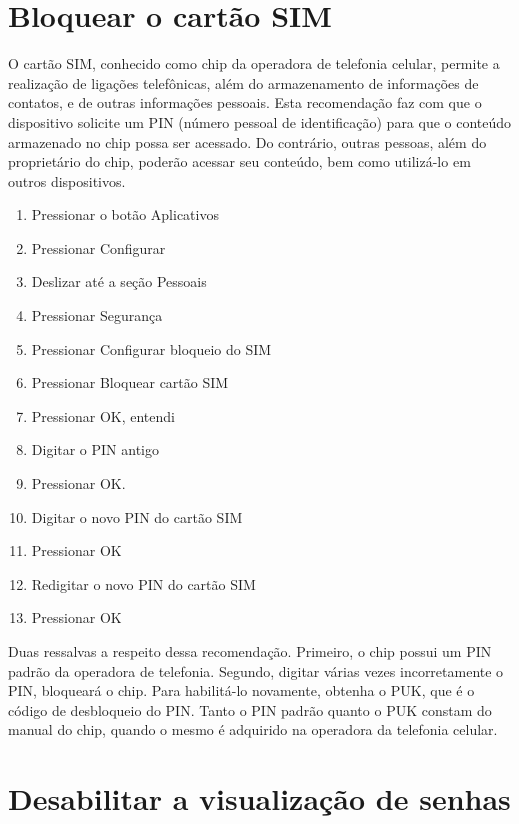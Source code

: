 \section{Bloquear o cart\~ao SIM}

O cart\~ao SIM, conhecido como chip da operadora de telefonia celular, permite a realiza\c c\~ao de liga\c c\~oes telef\^onicas, al\'em do armazenamento de informa\c c\~oes de contatos, e de outras informa\c c\~oes pessoais. Esta recomenda\c c\~ao faz com que o dispositivo solicite um PIN (n\'umero pessoal de identifica\c c\~ao) para que o conte\'udo armazenado no chip possa ser acessado. Do contr\'ario, outras pessoas, al\'em do propriet\'ario do chip, poder\~ao acessar seu conte\'udo, bem como utiliz\'a-lo em outros dispositivos.

\begin{enumerate}
\item Pressionar o bot\~ao Aplicativos
\item Pressionar Configurar
\item Deslizar at\'e a se\c c\~ao Pessoais
\item Pressionar Seguran\c ca
\item Pressionar Configurar bloqueio do SIM
\item Pressionar Bloquear cart\~ao SIM
\item Pressionar OK, entendi
\item Digitar o PIN antigo
\item Pressionar OK.
\item Digitar o novo PIN do cart\~ao SIM
\item Pressionar OK
\item Redigitar o novo PIN do cart\~ao SIM
\item Pressionar OK
\end{enumerate}

Duas ressalvas a respeito dessa recomenda\c c\~ao. Primeiro, o chip possui um PIN padr\~ao da operadora de telefonia. Segundo, digitar v\'arias vezes incorretamente o PIN, bloquear\'a o chip. Para habilit\'a-lo novamente, obtenha o PUK, que \'e o c\'odigo de desbloqueio do PIN. Tanto o PIN padr\~ao quanto o PUK constam do manual do chip, quando o mesmo \'e adquirido na operadora da telefonia celular.

\section{Desabilitar a visualiza\c c\~ao de senhas}

